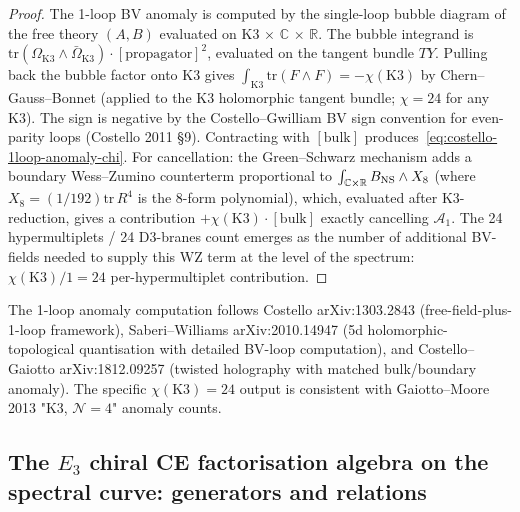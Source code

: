 \begin{proof}[Proof]
The 1-loop BV anomaly is computed by the single-loop bubble
diagram of the free theory $(A,B)$ evaluated on
K3 $\times$ $\mathbb{C}$ $\times$ $\mathbb{R}$. The bubble integrand is
$\mathrm{tr}(\Omega_{\mathrm{K3}}\wedge\bar\Omega_{\mathrm{K3}})\cdot
[\text{propagator}]^2$, evaluated on the tangent bundle $TY$.
Pulling back the bubble factor onto K3 gives
$\int_{\mathrm{K3}}\mathrm{tr}(F\wedge F) = -\chi(\mathrm{K3})$
by Chern--Gauss--Bonnet (applied to the K3 holomorphic tangent
bundle; $\chi = 24$ for any K3). The sign is negative by
the Costello--Gwilliam BV sign convention for even-parity loops
(Costello 2011 \S9). Contracting with $[\mathrm{bulk}]$
produces~\eqref{eq:costello-1loop-anomaly-chi}. For
cancellation: the Green--Schwarz mechanism adds a boundary
Wess--Zumino counterterm proportional to
$\int_{\mathbb C\times\mathbb R} B_{\mathrm{NS}}\wedge X_8$ (where
$X_8 = (1/192)\mathrm{tr}\,R^4$ is the 8-form polynomial), which,
evaluated after K3-reduction, gives a contribution
$+\chi(\mathrm{K3})\cdot[\mathrm{bulk}]$ exactly cancelling
$\mathcal A_1$. The 24 hypermultiplets / 24 D3-branes count
emerges as the number of additional BV-fields needed to
supply this WZ term at the level of the spectrum:
$\chi(\mathrm{K3})/1 = 24$ per-hypermultiplet contribution.
\end{proof}

\begin{remark}
\label{rem:costello-bv-primary-lit}
The 1-loop anomaly computation follows Costello
arXiv:1303.2843 (free-field-plus-1-loop framework),
Saberi--Williams arXiv:2010.14947
(5d holomorphic-topological quantisation with detailed
BV-loop computation), and Costello--Gaiotto arXiv:1812.09257
(twisted holography with matched bulk/boundary anomaly). The
specific $\chi(\mathrm{K3}) = 24$ output is consistent with
Gaiotto--Moore 2013 "K3, $\mathcal{N}=4$" anomaly counts.
\end{remark}

\providecommand{\g}{\mathfrak g}
\providecommand{\Disk}{\mathrm{Disk}}

\subsection{The $E_3$ chiral CE factorisation algebra on
the spectral curve: generators and relations}
\label{subsec:costello-e3-chiral-ce-gen-rel}

